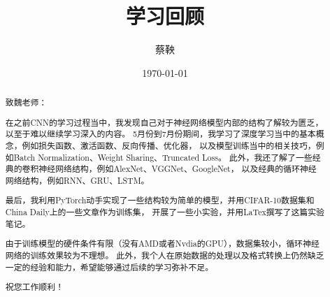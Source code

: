 \documentclass{article}
\title{学习回顾}
\author{蔡鞅}
\date{\today}
\begin{document}
	
	\maketitle 

  \begin{abstract}
    致魏老师：

    在之前CNN的学习过程当中，我发现自己对于神经网络模型内部的结构了解较为匮乏，
    以至于难以继续学习深入的内容。
    5月份到7月份期间，我学习了深度学习当中的基本概念，例如损失函数、激活函数、反向传播、优化器，
    以及模型训练当中的相关技巧，例如Batch Normalization、Weight Sharing、Truncated Loss。
    此外，我还了解了一些经典的卷积神经网络结构，例如AlexNet、VGGNet、GoogleNet，
    以及经典的循环神经网络结构，例如RNN、GRU、LSTM。
    
    最后，我利用PyTorch动手实现了一些结构较为简单的模型，并用CIFAR-10数据集和China Daily上的一些文章作为训练集，
    开展了一些小实验，并用LaTex撰写了这篇实验笔记。
    
    由于训练模型的硬件条件有限（没有AMD或者Nvdia的GPU），数据集较小，循环神经网络的训练效果较为不理想。
    此外，我个人在原始数据的处理以及格式转换上仍然缺乏一定的经验和能力，希望能够通过后续的学习弥补不足。

    祝您工作顺利！
  \end{abstract}

	\newpage
  
  
	
	

  
	
\end{document}
